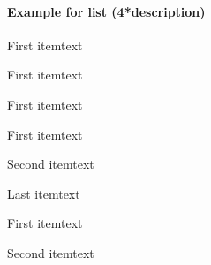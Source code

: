 \paragraph{Example for list (4*description)}

\begin{description}
  \item First itemtext
  \begin{description}
    \item First itemtext
    \begin{description}
      \item First itemtext
      \begin{description}
        \item First itemtext
        \item Second itemtext
      \end{description}
    \item Last itemtext
    \end{description}
  \item First itemtext
  \end{description}
  \item Second itemtext
\end{description}